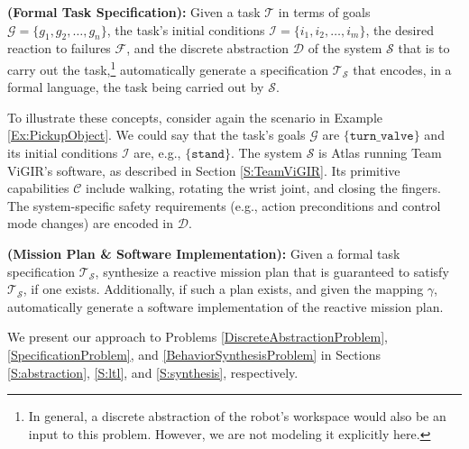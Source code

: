 \begin{myProblem}\label{SpecificationProblem}
\textbf{(Formal Task Specification):}
Given a task $\mathcal{T}$ in terms of goals $\mathcal{G} = \{ g_1, g_2, \ldots, g_n \}$, the task's initial conditions $\mathcal{I} = \{ i_1, i_2, \ldots, i_m \}$,
the desired reaction to failures $\mathcal{F}$,
and the discrete abstraction $\mathcal{D}$ of the system $\mathcal{S}$ that is to carry out the task,\footnote{In general, a discrete abstraction of the robot's workspace would also be an input to this problem. However, we are not modeling it explicitly here.}
 automatically generate a specification $\mathcal{T}_\mathcal{S}$ that encodes, in a formal language, the task being carried out by $\mathcal{S}$.
\end{myProblem}

To illustrate these concepts, consider again the scenario in Example \ref{Ex:PickupObject}. 
We could say that the task's goals $\mathcal{G}$ are $\{ \mathtt{turn\_valve} \}$ and its initial conditions $\mathcal{I}$ are, e.g., $\{ \mathtt{stand} \}$.
The system $\mathcal{S}$ is Atlas running Team ViGIR's software, as described in Section \ref{S:TeamViGIR}.
Its primitive capabilities $\mathcal{C}$ include walking, rotating the wrist joint, and closing the fingers.
The system-specific safety requirements (e.g., action preconditions and control mode changes) are encoded in $\mathcal{D}$.

\begin{myProblem}\label{BehaviorSynthesisProblem}
\textbf{(Mission Plan \& Software Implementation):}
Given a formal task specification $\mathcal{T}_\mathcal{S}$, synthesize a reactive mission plan that is guaranteed to satisfy $\mathcal{T}_\mathcal{S}$, if one exists.
Additionally, if such a plan exists, and given the mapping $\gamma$, automatically generate a software implementation of the reactive mission plan. 
\end{myProblem}

We present our approach to Problems \ref{DiscreteAbstractionProblem}, \ref{SpecificationProblem}, and \ref{BehaviorSynthesisProblem} in Sections \ref{S:abstraction}, \ref{S:ltl}, and \ref{S:synthesis}, respectively.


